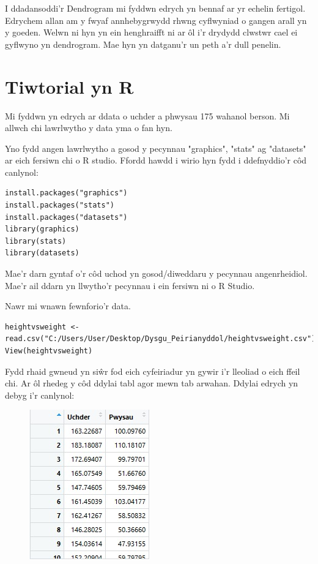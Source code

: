 I ddadansoddi'r Dendrogram mi fyddwn edrych yn bennaf ar yr echelin fertigol. Edrychem allan am y fwyaf annhebygrwydd rhwng cyflwyniad o gangen arall yn y goeden. Welwn ni hyn yn ein henghraifft ni ar \^{o}l i'r drydydd clwstwr cael ei gyflwyno yn dendrogram. Mae hyn yn datganu'r un peth a'r dull penelin.

\section{Tiwtorial yn R}
Mi fyddwn yn edrych ar ddata o uchder a phwysau 175 wahanol berson. Mi allwch chi lawrlwytho y data yma o fan hyn. 

Yno fydd angen lawrlwytho a gosod y pecynnau "graphics", "stats" ag "datasets" ar eich fersiwn chi o R studio. Ffordd hawdd i wirio hyn fydd i ddefnyddio'r c\^{o}d canlynol:

\begin{verbatim}
install.packages("graphics")
install.packages("stats")
install.packages("datasets")
library(graphics)
library(stats)
library(datasets)
\end{verbatim}
Mae'r darn gyntaf o'r c\^{o}d uchod yn gosod/diweddaru y pecynnau angenrheidiol. Mae'r ail ddarn yn llwytho'r pecynnau i ein fersiwn ni o R Studio.

Nawr mi wnawn fewnforio'r data. 

\begin{verbatim}
heightvsweight <- read.csv("C:/Users/User/Desktop/Dysgu_Peirianyddol/heightvsweight.csv")
View(heightvsweight)
\end{verbatim}

Fydd rhaid gwneud yn si\^{w}r fod eich cyfeiriadur yn gywir i'r lleoliad o eich ffeil chi.
Ar \^{o}l rhedeg y c\^{o}d ddylai tabl agor mewn tab arwahan. Ddylai edrych yn debyg i'r canlynol:

\begin{figure}[H]
\includegraphics[width=0.35\linewidth]{../img/Data_yn_R.jpg}
\label{fig:DataR}
\end{figure}

